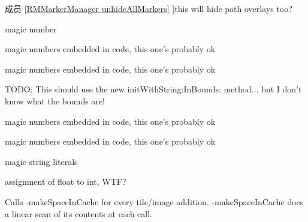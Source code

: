 \begin{DoxyRefList}
\hypertarget{bug__bug000030}{}%
成员 \hyperlink{interface_r_m_marker_manager_ac31f5340920245dd9b6a3068c720fee1}{\mbox{[}R\-M\-Marker\-Manager unhide\-All\-Markers\mbox{]}} ]this will hide path overlays too?  
\item[\label{bug__bug000031}%
\hypertarget{bug__bug000031}{}%
成员 \hyperlink{interface_r_m_memory_cache_ad00544180919205d1de0f053620b13de}{\mbox{[}R\-M\-Memory\-Cache init\mbox{]}} ]magic number  
\item[\label{bug__bug000035}%
\hypertarget{bug__bug000035}{}%
成员 \hyperlink{interface_r_m_projection_a8d54612fc9b40930999b22dbf3638560}{\mbox{[}R\-M\-Projection E\-P\-S\-G\-Lat\-Long\mbox{]}} ]magic numbers embedded in code, this one's probably ok  
\item[\label{bug__bug000033}%
\hypertarget{bug__bug000033}{}%
成员 \hyperlink{interface_r_m_projection_a650e692e75f1b5336570a6cd28f22ca0}{\mbox{[}R\-M\-Projection google\-Projection\mbox{]}} ]magic numbers embedded in code, this one's probably ok  
\item[\label{bug__bug000036}%
\hypertarget{bug__bug000036}{}%
成员 \hyperlink{interface_r_m_projection_a522a3cdd02936b5088085a9477717302}{\mbox{[}R\-M\-Projection O\-S\-G\-B\mbox{]}} ]T\-O\-D\-O\-: This should use the new init\-With\-String\-:\-In\-Bounds\-: method... but I don't know what the bounds are! 

magic numbers embedded in code, this one's probably ok  
\item[\label{bug__bug000034}%
\hypertarget{bug__bug000034}{}%
成员 \hyperlink{interface_r_m_projection_af713cfc503b88c2f1c387423004d98a1}{\mbox{[}R\-M\-Projection sm\-Projection\-:\mbox{]}} ]magic numbers embedded in code, this one's probably ok  
\item[\label{bug__bug000039}%
\hypertarget{bug__bug000039}{}%
成员 \hyperlink{interface_r_m_s_m_tile_projection_a77c16d194ed35ef8aeccacd92f150cc7}{\mbox{[}R\-M\-S\-M\-Tile\-Projection init\-From\-Projection\-:tile\-Side\-Length\-:max\-Zoom\-:min\-Zoom\-:info\-:resolutions\-:\mbox{]}} ]magic string literals  
\item[\label{bug__bug000040}%
\hypertarget{bug__bug000040}{}%
成员 \hyperlink{interface_r_m_s_m_tile_projection_a8442a53b7624d621ab15d9027b48b7e9}{\mbox{[}R\-M\-S\-M\-Tile\-Projection project\-Rect\-:at\-Zoom\-:\mbox{]}} ]assignment of float to int, W\-T\-F?  
\item[\label{bug__bug000041}%
\hypertarget{bug__bug000041}{}%
成员 \hyperlink{interface_r_m_tile_cache_a6ce63fa534992f6ee7c15df022af6c1d}{\mbox{[}R\-M\-Tile\-Cache add\-Tile\-:With\-Image\-:\mbox{]}} ]Calls -\/make\-Space\-In\-Cache for every tile/image addition. -\/make\-Space\-In\-Cache does a linear scan of its contents at each call.


\end{DoxyRefList}
